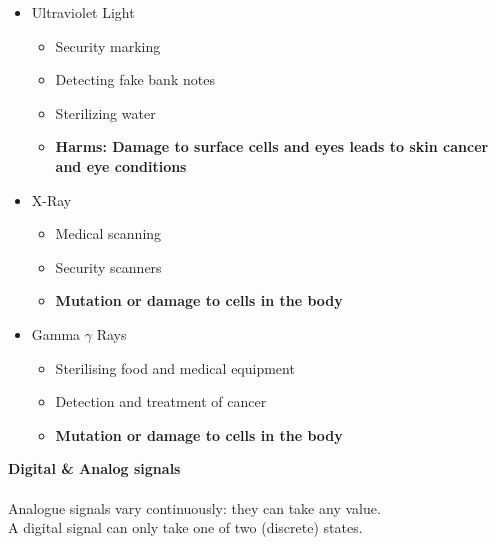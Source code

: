 \documentclass[a4paper,12pt]{article}
\begin{document}
\begin{itemize}
\begin{itemize}
        \item Vision
        \item Photography
        \item Illumination
    \end{itemize}
    \item Ultraviolet Light
    \begin{itemize}
        \item Security marking
        \item Detecting fake bank notes
        \item Sterilizing water
        \item \textbf{Harms: Damage to surface cells and eyes leads to skin cancer and eye conditions}
    \end{itemize}
    \item X-Ray
    \begin{itemize}
        \item Medical scanning
        \item Security scanners
        \item \textbf{Mutation or damage to cells in the body}
    \end{itemize}
    \item Gamma \(\gamma\) Rays
    \begin{itemize}
        \item Sterilising food and medical equipment
        \item Detection and treatment of cancer
        \item \textbf{Mutation or damage to cells in the body}
    \end{itemize}
\end{itemize}
\textbf{Digital \& Analog signals}\\\\
Analogue signals vary continuously: they can take any value.\\
A digital signal can only take one of two (discrete) states.
\end{document}
